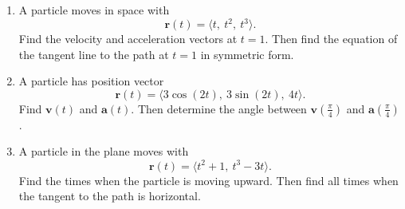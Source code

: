 \documentclass[12pt]{article}
\begin{document}
\begin{enumerate}[leftmargin=*, itemsep=1em, topsep=0.8em]
  \item A particle moves in space with
  \[
  \mathbf{r}(t)=\langle t,\ t^2,\ t^3\rangle.
  \]
  Find the velocity and acceleration vectors at $t=1$. Then find the equation of the tangent line to the path at $t=1$ in symmetric form.

  \item A particle has position vector
  \[
  \mathbf{r}(t)=\langle 3\cos(2t),\ 3\sin(2t),\ 4t\rangle.
  \]
  Find $\mathbf{v}(t)$ and $\mathbf{a}(t)$. Then determine the angle between $\mathbf{v}\!\left(\frac{\pi}{4}\right)$ and $\mathbf{a}\!\left(\frac{\pi}{4}\right)$.

  \item A particle in the plane moves with
  \[
  \mathbf{r}(t)=\langle t^2+1,\ t^3-3t\rangle.
  \]
  Find the times when the particle is moving upward. Then find all times when the tangent to the path is horizontal.
\end{enumerate}
\end{document}
